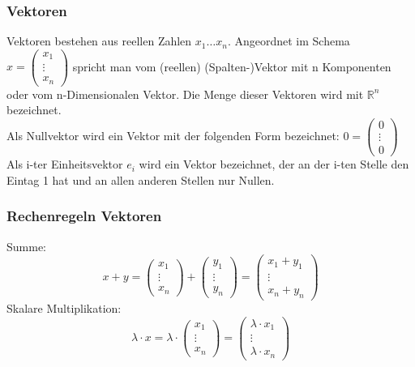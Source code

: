 \documentclass[10pt]{scrartcl}
\begin{document}
\begin{multicols}{2}
\subsubsection*{Vektoren}
Vektoren bestehen aus reellen Zahlen $x_{1} \dots x_{n}$. Angeordnet im Schema $x=\left( \begin{matrix} x_{1} \\ \vdots \\ x_{n}\end{matrix}\right) $ spricht man vom (reellen) (Spalten-)Vektor mit n Komponenten oder vom n-Dimensionalen Vektor. Die Menge dieser Vektoren wird mit $\mathbb{R}^{n}$ bezeichnet.\\
Als Nullvektor wird ein Vektor mit der folgenden Form bezeichnet: $0=\left( \begin{matrix} 0 \\ \vdots \\ 0\end{matrix}\right) $\\
Als i-ter Einheitsvektor $e_{i}$ wird ein Vektor bezeichnet, der an der i-ten Stelle den Eintag 1 hat und an allen anderen Stellen nur Nullen.
\subsubsection*{Rechenregeln Vektoren}
Summe:\\
\begin{equation}
x + y = \begin{pmatrix}
x_1\\
\vdots\\
x_n
\end{pmatrix} + \begin{pmatrix}
y_1\\
\vdots\\
y_n
\end{pmatrix} = \begin{pmatrix}
x_1 + y_1\\
\vdots\\
x_n + y_n
\end{pmatrix}
\end{equation}
Skalare Multiplikation:\\
\begin{equation}
\lambda \cdot x = \lambda \cdot \begin{pmatrix}
x_1 \\
\vdots \\
x_n
\end{pmatrix} = \begin{pmatrix}
\lambda \cdot x_1 \\
\vdots \\
\lambda \cdot x_n
\end{pmatrix}
\end{equation}

\end{multicols}
\end{document}
